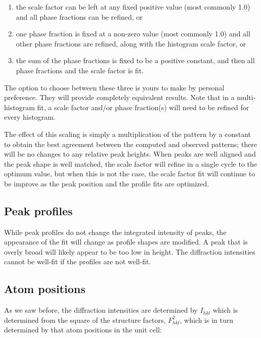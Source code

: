 \begin{enumerate}
    \item the scale factor can be left at any fixed positive value (most commonly 1.0) and all phase fractions can be refined, or 
    \item one phase fraction is fixed at a non-zero value (most commonly 1.0) and all other phase fractions are refined, along with the histogram scale factor, or 
    \item the sum of the phase fractions is fixed to be a positive constant, and then all phase fractions and the scale factor is fit.
\end{enumerate}

The option to choose between these three is yours to make by personal preference. They will provide completely equivalent results. Note that in a multi-histogram fit, a scale factor and/or phase fraction(s) will need to be refined for every histogram.

The effect of this scaling is simply a multiplication of the pattern by a constant to obtain the best agreement between the computed and observed patterns; there will be no changes to any relative peak heights. When peaks are well aligned and the peak shape is well matched, the scale factor will refine in a single cycle to the optimum value, but when this is not the case, the scale factor fit will continue to be improve as the peak position and the profile fits are optimized. 

\subsection{Peak profiles}
While peak profiles do not change the integrated intensity of peaks, the appearance of the fit will change as profile shapes are modified. A peak that is overly broad will likely appear to be too low in height. The diffraction intensities cannot be well-fit if the profiles are not well-fit. 

\subsection{Atom positions}
As we saw before, the diffraction intensities are determined by $I_{hkl}$ which is determined from the square of the structure factors, $F_{hkl}^2$, which is in turn determined by that atom positions in the unit cell:

